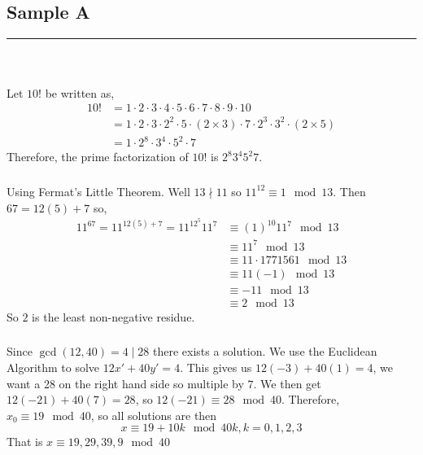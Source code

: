 \documentclass[class=article, crop=false]{standalone}
\begin{document}

\setcounter{section}{5}
\setcounter{subsection}{0}

\subsection{Sample A}
\rule{\textwidth}{1pt}\\
\subsubsection{}
Let $10!$ be written as,
	\begin{align*}
		10! &= 1\cdot 2\cdot 3\cdot 4\cdot 5\cdot 6\cdot 7\cdot 8\cdot 9\cdot 10 \\
		&= 1\cdot 2\cdot 3\cdot 2^2\cdot 5\cdot (2\times 3)\cdot 7\cdot 2^3\cdot 3^2\cdot (2\times 5) \\
		&= 1\cdot 2^8\cdot 3^4\cdot 5^2\cdot 7
	\end{align*}
	Therefore, the prime factorization of $10!$ is $2^8 3^4 5^2 7$.

\subsubsection{}
Using Fermat's Little Theorem. 
	Well $13\nmid 11$ so $11^{12} \equiv 1\mod 13$. Then $67= 12(5) + 7$ so,
	\begin{align*}
		11^{67} = 11^{12(5)+7} = 11^{12^5}11^7 &\equiv (1)^{10} 11^{7} \mod 13 \\
		&\equiv 11^7 \mod 13 \\
		&\equiv 11 \cdot 1771561 \mod 13 \\
		&\equiv 11 (-1) \mod 13 \\
		&\equiv -11 \mod 13 \\
		&\equiv 2 \mod 13
	\end{align*}
	So $2$ is the least non-negative residue.

\subsubsection{}
Since $\gcd(12,40)=4\mid 28$ there exists a solution. We use the Euclidean Algorithm to solve
	$12x' + 40y' = 4$. This gives us $12(-3)+40(1)=4$, we want a 28 on the right hand side so 
	multiple by $7$. We then get $12(-21)+40(7)=28$, so $12(-21)\equiv 28\mod 40$. Therefore,
	$x_0 \equiv 19\mod 40$, so all solutions are then
	$$x\equiv 19 + 10k\mod 40k, k=0,1,2,3$$
	That is $x\equiv 19, 29, 39, 9\mod 40$
\end{document}
